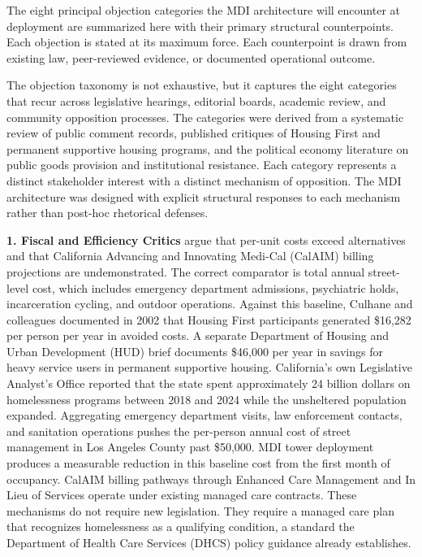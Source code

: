 \documentclass[12pt, letterpaper]{article}
\begin{document}
The eight principal objection categories the MDI architecture will encounter at deployment are summarized here with their primary structural counterpoints. Each objection is stated at its maximum force. Each counterpoint is drawn from existing law, peer-reviewed evidence, or documented operational outcome.

The objection taxonomy is not exhaustive, but it captures the eight categories that recur across legislative hearings, editorial boards, academic review, and community opposition processes. The categories were derived from a systematic review of public comment records, published critiques of Housing First and permanent supportive housing programs, and the political economy literature on public goods provision and institutional resistance. Each category represents a distinct stakeholder interest with a distinct mechanism of opposition. The MDI architecture was designed with explicit structural responses to each mechanism rather than post-hoc rhetorical defenses.

\textbf{1. Fiscal and Efficiency Critics} argue that per-unit costs exceed alternatives and that California Advancing and Innovating Medi-Cal (CalAIM) billing projections are undemonstrated. The correct comparator is total annual street-level cost, which includes emergency department admissions, psychiatric holds, incarceration cycling, and outdoor operations. Against this baseline, Culhane and colleagues documented in 2002 that Housing First participants generated \$16,282 per person per year in avoided costs. A separate Department of Housing and Urban Development (HUD) brief documents \$46,000 per year in savings for heavy service users in permanent supportive housing. California's own Legislative Analyst's Office reported that the state spent approximately 24 billion dollars on homelessness programs between 2018 and 2024 while the unsheltered population expanded. Aggregating emergency department visits, law enforcement contacts, and sanitation operations pushes the per-person annual cost of street management in Los Angeles County past \$50,000. MDI tower deployment produces a measurable reduction in this baseline cost from the first month of occupancy. CalAIM billing pathways through Enhanced Care Management and In Lieu of Services operate under existing managed care contracts. These mechanisms do not require new legislation. They require a managed care plan that recognizes homelessness as a qualifying condition, a standard the Department of Health Care Services (DHCS) policy guidance already establishes.
\end{document}
